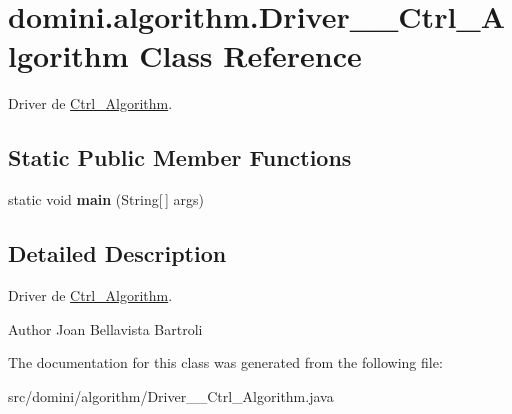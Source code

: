 \hypertarget{classdomini_1_1algorithm_1_1Driver____Ctrl__Algorithm}{}\section{domini.\+algorithm.\+Driver\+\_\+\+\_\+\+Ctrl\+\_\+\+Algorithm Class Reference}
\label{classdomini_1_1algorithm_1_1Driver____Ctrl__Algorithm}


Driver de \hyperlink{classdomini_1_1algorithm_1_1Ctrl__Algorithm}{Ctrl\+\_\+\+Algorithm}.  


\subsection*{Static Public Member Functions}
\begin{DoxyCompactItemize}
\item 
\mbox{\label{classdomini_1_1algorithm_1_1Driver____Ctrl__Algorithm_a2aa6a8b8f8c0c991a11b30e2bd1f244e}} 
static void {\bfseries main} (String\mbox{[}$\,$\mbox{]} args)
\end{DoxyCompactItemize}


\subsection{Detailed Description}
Driver de \hyperlink{classdomini_1_1algorithm_1_1Ctrl__Algorithm}{Ctrl\+\_\+\+Algorithm}. 

\begin{DoxyAuthor}{Author}
Joan Bellavista Bartroli 
\end{DoxyAuthor}


The documentation for this class was generated from the following file\+:\begin{DoxyCompactItemize}
\item 
src/domini/algorithm/Driver\+\_\+\+\_\+\+Ctrl\+\_\+\+Algorithm.\+java\end{DoxyCompactItemize}
